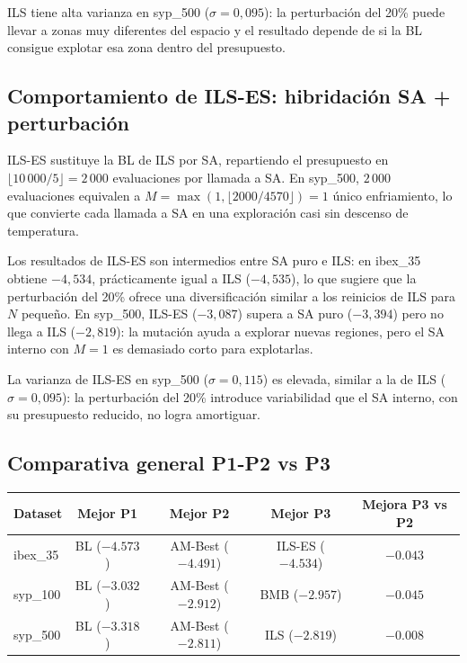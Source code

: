\documentclass[12pt,a4paper]{article}
\begin{document}
ILS tiene alta varianza en syp\_500 ($\sigma=0{,}095$): la perturbación del 20\% puede
llevar a zonas muy diferentes del espacio y el resultado depende de si la BL consigue
explotar esa zona dentro del presupuesto.

\subsection{Comportamiento de ILS-ES: hibridación SA + perturbación}

ILS-ES sustituye la BL de ILS por SA, repartiendo el presupuesto en
$\lfloor 10\,000/5\rfloor = 2\,000$ evaluaciones por llamada a SA. En syp\_500,
$2\,000$ evaluaciones equivalen a $M=\max(1,\lfloor 2000/4570\rfloor)=1$ único
enfriamiento, lo que convierte cada llamada a SA en una exploración casi sin
descenso de temperatura.

Los resultados de ILS-ES son intermedios entre SA puro e ILS: en ibex\_35 obtiene
$-4{,}534$, prácticamente igual a ILS ($-4{,}535$), lo que sugiere que la perturbación
del 20\% ofrece una diversificación similar a los reinicios de ILS para $N$ pequeño.
En syp\_500, ILS-ES ($-3{,}087$) supera a SA puro ($-3{,}394$) pero no llega a ILS
($-2{,}819$): la mutación ayuda a explorar nuevas regiones, pero el SA interno con
$M=1$ es demasiado corto para explotarlas.

La varianza de ILS-ES en syp\_500 ($\sigma=0{,}115$) es elevada, similar a la de ILS
($\sigma=0{,}095$): la perturbación del 20\% introduce variabilidad que el SA interno,
con su presupuesto reducido, no logra amortiguar.

\subsection{Comparativa general P1-P2 vs P3}

\begin{center}
\begin{tabular}{lcccc}
\toprule
\textbf{Dataset} & \textbf{Mejor P1} & \textbf{Mejor P2} & \textbf{Mejor P3} & \textbf{Mejora P3 vs P2} \\
\midrule
ibex\_35  & BL ($-4.573$) & AM-Best ($-4.491$) & ILS-ES ($-4.534$) & $-0.043$ \\
syp\_100  & BL ($-3.032$) & AM-Best ($-2.912$) & BMB ($-2.957$)    & $-0.045$ \\
syp\_500  & BL ($-3.318$) & AM-Best ($-2.811$) & ILS ($-2.819$)    & $-0.008$ \\
\bottomrule
\end{tabular}
\end{center}
\end{document}
